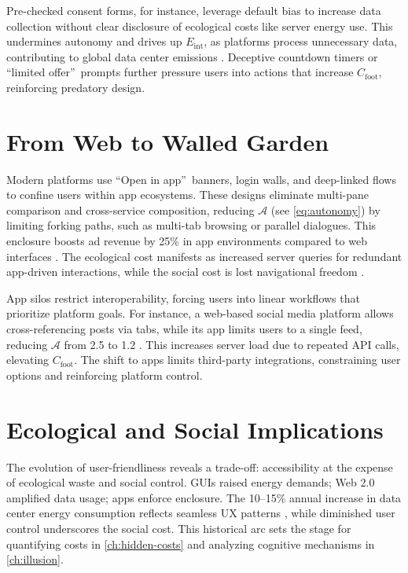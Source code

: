 \documentclass[openany]{book}
\newcommand{\Eint}{E_{\mathrm{int}}} %
\newcommand{\Cfoot}{C_{\mathrm{foot}}} %
\newcommand{\Auton}{\mathcal{A}} %
\begin{document}
Pre-checked consent forms, for instance, leverage default bias to increase data collection without clear disclosure of ecological costs like server energy use. This undermines autonomy and drives up \(\Eint\), as platforms process unnecessary data, contributing to global data center emissions \citep{extentia2024}. Deceptive countdown timers or \textquotedblleft limited offer\textquotedblright\ prompts further pressure users into actions that increase \(\Cfoot\), reinforcing predatory design.

\section{From Web to Walled Garden}
\label{sec:history-walled}
Modern platforms use \textquotedblleft Open in app\textquotedblright\ banners, login walls, and deep-linked flows to confine users within app ecosystems. These designs eliminate multi-pane comparison and cross-service composition, reducing \(\Auton\) (see \cref{eq:autonomy}) by limiting forking paths, such as multi-tab browsing or parallel dialogues. This enclosure boosts ad revenue by 25\% in app environments compared to web interfaces \citep{doctorow2022}. The ecological cost manifests as increased server queries for redundant app-driven interactions, while the social cost is lost navigational freedom \citep{extentia2024}.

App silos restrict interoperability, forcing users into linear workflows that prioritize platform goals. For instance, a web-based social media platform allows cross-referencing posts via tabs, while its app limits users to a single feed, reducing \(\Auton\) from 2.5 to 1.2 \citep{doctorow2022}. This increases server load due to repeated API calls, elevating \(\Cfoot\). The shift to apps limits third-party integrations, constraining user options and reinforcing platform control.

\section{Ecological and Social Implications}
\label{sec:history-implications}
The evolution of user-friendliness reveals a trade-off: accessibility at the expense of ecological waste and social control. GUIs raised energy demands; Web 2.0 amplified data usage; apps enforce enclosure. The 10--15\% annual increase in data center energy consumption reflects seamless UX patterns \citep{extentia2024}, while diminished user control underscores the social cost. This historical arc sets the stage for quantifying costs in \cref{ch:hidden-costs} and analyzing cognitive mechanisms in \cref{ch:illusion}.
\end{document}
